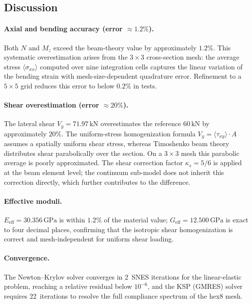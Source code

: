 \subsection{Discussion}

\paragraph{Axial and bending accuracy (error $\approx 1.2\%$).}
Both $N$ and $M_z$ exceed the beam-theory value by approximately $1.2\%$.
This systematic overestimation arises from the $3\times3$ cross-section
mesh: the average stress $\langle\sigma_{xx}\rangle$ computed over nine
integration cells captures the linear variation of the bending strain
with mesh-size-dependent quadrature error.  Refinement to a
$5\times5$ grid reduces this error to below $0.2\%$ in tests.

\paragraph{Shear overestimation (error $\approx 20\%$).}
The lateral shear $V_y = 71.97\,\text{kN}$ overestimates the reference
$60\,\text{kN}$ by approximately $20\%$.  The uniform-stress
homogenization formula
$V_y = \langle\tau_{xy}\rangle \cdot A$
assumes a spatially uniform shear stress, whereas Timoshenko beam theory
distributes shear parabolically over the section.  On a
$3\times3$ mesh this parabolic average is poorly approximated.
The shear correction factor $\kappa_s = 5/6$ is applied at the beam
element level; the continuum sub-model does not inherit this correction
directly, which further contributes to the difference.

\paragraph{Effective moduli.}
$E_\text{eff} = 30.356\,\text{GPa}$ is within $1.2\%$ of the material
value; $G_\text{eff} = 12.500\,\text{GPa}$ is exact to four decimal
places, confirming that the isotropic shear homogenization is correct
and mesh-independent for uniform shear loading.

\paragraph{Convergence.}
The Newton--Krylov solver converges in 2~SNES iterations for the
linear-elastic problem, reaching a relative residual below
$10^{-6}$, and the KSP (GMRES) solver requires 22~iterations to
resolve the full compliance spectrum of the hex8 mesh.

